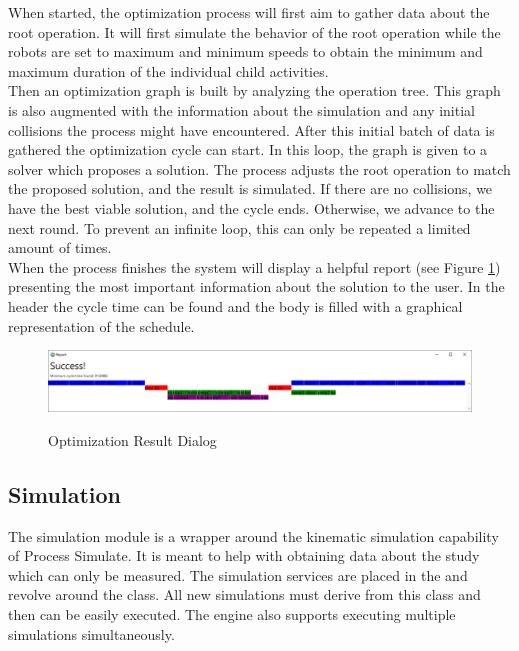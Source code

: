 When started, the optimization process will first aim to gather data about the root operation. It will first simulate the behavior of the root operation while the robots are set to maximum and minimum speeds to obtain the minimum and maximum duration of the individual child activities.\\

Then an optimization graph is built by analyzing the operation tree. This graph is also augmented with the information about the simulation and any initial collisions the process might have encountered. After this initial batch of data is gathered the optimization cycle can start. In this loop, the graph is given to a solver which proposes a solution. The process adjusts the root operation to match the proposed solution, and the result is simulated. If there are no collisions, we have the best viable solution, and the cycle ends. Otherwise, we advance to the next round. To prevent an infinite loop, this can only be repeated a limited amount of times. \\

When the process finishes the system will display a helpful report (see Figure \ref{fig:DialogOptimizationResult}) presenting the most important information about the solution to the user. In the header the cycle time can be found and the body is filled with a graphical representation of the schedule.  

\begin{figure}[ht]
	\caption{Optimization Result Dialog}
	\centering
	\includegraphics[width=\textwidth]{dialog_optimizationresult}
	\label{fig:DialogOptimizationResult}
\end{figure}

\subsection{Simulation}

The simulation module is a wrapper around the kinematic simulation capability of Process Simulate. It is meant to help with obtaining data about the study which can only be measured. The simulation services are placed in the  and revolve around the  class. All new simulations must derive from this class and then can be easily executed. The engine also supports executing multiple simulations simultaneously. \\

